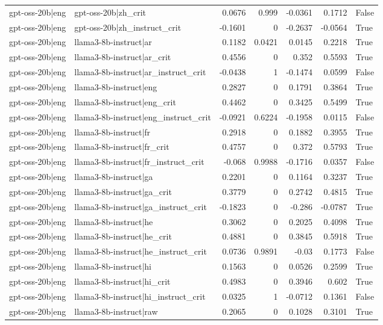\begin{table}
\begin{tabular}{l l r r r r l}
gpt-oss-20b|eng & gpt-oss-20b|zh_crit & 0.0676 & 0.999 & -0.0361 & 0.1712 & False \\
gpt-oss-20b|eng & gpt-oss-20b|zh_instruct_crit & -0.1601 & 0 & -0.2637 & -0.0564 & True \\
gpt-oss-20b|eng & llama3-8b-instruct|ar & 0.1182 & 0.0421 & 0.0145 & 0.2218 & True \\
gpt-oss-20b|eng & llama3-8b-instruct|ar_crit & 0.4556 & 0 & 0.352 & 0.5593 & True \\
gpt-oss-20b|eng & llama3-8b-instruct|ar_instruct_crit & -0.0438 & 1 & -0.1474 & 0.0599 & False \\
gpt-oss-20b|eng & llama3-8b-instruct|eng & 0.2827 & 0 & 0.1791 & 0.3864 & True \\
gpt-oss-20b|eng & llama3-8b-instruct|eng_crit & 0.4462 & 0 & 0.3425 & 0.5499 & True \\
gpt-oss-20b|eng & llama3-8b-instruct|eng_instruct_crit & -0.0921 & 0.6224 & -0.1958 & 0.0115 & False \\
gpt-oss-20b|eng & llama3-8b-instruct|fr & 0.2918 & 0 & 0.1882 & 0.3955 & True \\
gpt-oss-20b|eng & llama3-8b-instruct|fr_crit & 0.4757 & 0 & 0.372 & 0.5793 & True \\
gpt-oss-20b|eng & llama3-8b-instruct|fr_instruct_crit & -0.068 & 0.9988 & -0.1716 & 0.0357 & False \\
gpt-oss-20b|eng & llama3-8b-instruct|ga & 0.2201 & 0 & 0.1164 & 0.3237 & True \\
gpt-oss-20b|eng & llama3-8b-instruct|ga_crit & 0.3779 & 0 & 0.2742 & 0.4815 & True \\
gpt-oss-20b|eng & llama3-8b-instruct|ga_instruct_crit & -0.1823 & 0 & -0.286 & -0.0787 & True \\
gpt-oss-20b|eng & llama3-8b-instruct|he & 0.3062 & 0 & 0.2025 & 0.4098 & True \\
gpt-oss-20b|eng & llama3-8b-instruct|he_crit & 0.4881 & 0 & 0.3845 & 0.5918 & True \\
gpt-oss-20b|eng & llama3-8b-instruct|he_instruct_crit & 0.0736 & 0.9891 & -0.03 & 0.1773 & False \\
gpt-oss-20b|eng & llama3-8b-instruct|hi & 0.1563 & 0 & 0.0526 & 0.2599 & True \\
gpt-oss-20b|eng & llama3-8b-instruct|hi_crit & 0.4983 & 0 & 0.3946 & 0.602 & True \\
gpt-oss-20b|eng & llama3-8b-instruct|hi_instruct_crit & 0.0325 & 1 & -0.0712 & 0.1361 & False \\
gpt-oss-20b|eng & llama3-8b-instruct|raw & 0.2065 & 0 & 0.1028 & 0.3101 & True \\

\end{tabular}
\end{table}
